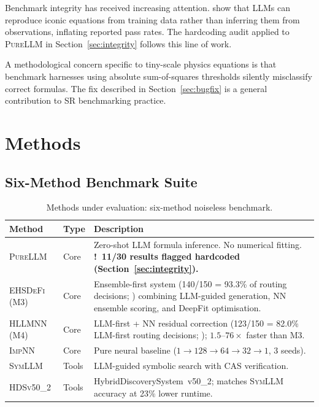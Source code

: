 \documentclass[twoside,11pt]{article}
\newcommand{\PureLLM}{\textsc{PureLLM}}
\newcommand{\INN}{\textsc{ImpNN}}
\newcommand{\EHD}{\textsc{EHSDeFi}}
\newcommand{\HSL}{\textsc{HLLMNN}}
\newcommand{\SEL}{\textsc{SymLLM}}
\newcommand{\HDS}{\textsc{HDSv50\_2}}
\newcommand{\warn}{{\color{warnAmber}\textbf{!}}}
\begin{document}
Benchmark integrity has received increasing attention.
\citet{memorization2024audit} show that LLMs can reproduce iconic equations
from training data rather than inferring them from observations, inflating
reported pass rates.  The hardcoding audit applied to \PureLLM{} in
Section~\ref{sec:integrity} follows this line of work.

A methodological concern specific to tiny-scale physics equations is that
benchmark harnesses using absolute sum-of-squares thresholds silently
misclassify correct formulas.  The fix described in Section~\ref{sec:bugfix}
is a general contribution to SR benchmarking practice.

\section{Methods}
\label{sec:methods}

\subsection{Six-Method Benchmark Suite}
\label{sec:methods:sixmethod}

\begin{table}[ht]
\caption{Methods under evaluation: six-method noiseless benchmark.}
\label{tab:methods}
\centering
\small
\renewcommand{\arraystretch}{1.3}
\begin{tabular}{L{2.1cm} L{1.3cm} L{8.0cm}}
\toprule
\textbf{Method} & \textbf{Type} & \textbf{Description} \\
\midrule
{}
\PureLLM & Core &
  Zero-shot LLM formula inference.  No numerical fitting.
  \textbf{\warn~11/30 results flagged hardcoded (Section~\ref{sec:integrity}).} \\
\EHD\,(M3) & Core &
  Ensemble-first system (140/150 = 93.3\% of routing decisions; ) combining LLM-guided generation,
  NN ensemble scoring, and DeepFit optimisation. \\
\HSL\,(M4) & Core &
  LLM-first + NN residual correction (123/150 = 82.0\% LLM-first routing decisions; );
  $1.5$--$76\times$ faster than M3. \\
\INN & Core &
  Pure neural baseline ($1\!\to\!128\!\to\!64\!\to\!32\!\to\!1$, 3 seeds). \\
\SEL & Tools &
  LLM-guided symbolic search with CAS verification. \\
\HDS & Tools &
  HybridDiscoverySystem~v50\_2; matches \SEL{} accuracy at 23\% lower runtime. \\
\bottomrule
\end{tabular}
\end{table}
\end{document}

